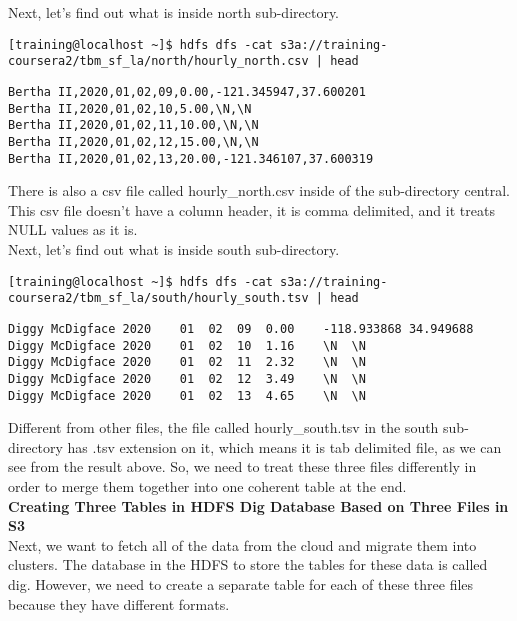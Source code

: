 \documentclass[a4paper,
							12pt,
							oneside,
							openright,
							DIV10,
							numbers=noendperiod
							]{scrreprt} %
\begin{document}
\noindent
Next, let's find out what is inside north sub-directory.
\begin{lstlisting}
[training@localhost ~]$ hdfs dfs -cat s3a://training-coursera2/tbm_sf_la/north/hourly_north.csv | head
\end{lstlisting}

\begin{lstlisting}
Bertha II,2020,01,02,09,0.00,-121.345947,37.600201
Bertha II,2020,01,02,10,5.00,\N,\N
Bertha II,2020,01,02,11,10.00,\N,\N
Bertha II,2020,01,02,12,15.00,\N,\N
Bertha II,2020,01,02,13,20.00,-121.346107,37.600319
\end{lstlisting}

\noindent
There is also a csv file called hourly\_north.csv inside of the sub-directory central. This csv file doesn't have a column header, it is comma delimited, and it treats NULL values as it is.\\

\noindent
Next, let's find out what is inside south sub-directory.

\begin{lstlisting}
[training@localhost ~]$ hdfs dfs -cat s3a://training-coursera2/tbm_sf_la/south/hourly_south.tsv | head
\end{lstlisting}

\begin{lstlisting}
Diggy McDigface	2020	01	02	09	0.00	-118.933868	34.949688
Diggy McDigface	2020	01	02	10	1.16	\N	\N
Diggy McDigface	2020	01	02	11	2.32	\N	\N
Diggy McDigface	2020	01	02	12	3.49	\N	\N
Diggy McDigface	2020	01	02	13	4.65	\N	\N
\end{lstlisting}

\noindent
Different from other files, the file called hourly\_south.tsv in the south sub-directory has .tsv extension on it, which means it is tab delimited file, as we can see from the result above. So, we need to treat these three files differently in order to merge them together into one coherent table at the end.\\

\noindent
\textbf{Creating Three Tables in HDFS Dig Database Based on Three Files in S3}\\

\noindent
Next, we want to fetch all of the data from the cloud and migrate them into clusters. The database in the HDFS to store the tables for these data is called dig. However, we need to create a separate table for each of these three files because they have different formats.\\
\end{document}
